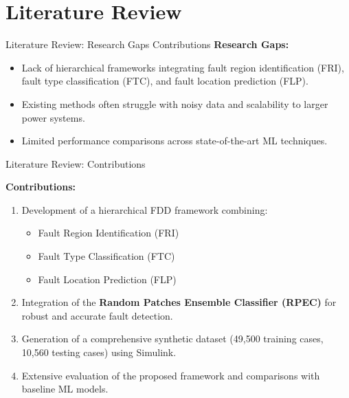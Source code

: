 \section{Literature Review}  

\begin{frame}{Literature Review: Research Gaps Contributions}
  \textbf{Research Gaps:}
  \begin{itemize}
    \item Lack of hierarchical frameworks integrating fault region identification (FRI), fault type classification (FTC), and fault location prediction (FLP).
    \item Existing methods often struggle with noisy data and scalability to larger power systems.
    \item Limited performance comparisons across state-of-the-art ML techniques.
  \end{itemize}
  \vspace{0.5cm}
\end{frame}

\begin{frame}{Literature Review: Contributions}
    
  \textbf{Contributions:}
  \begin{enumerate}
    \item Development of a hierarchical FDD framework combining:
        \begin{itemize}
            \item Fault Region Identification (FRI)
            \item Fault Type Classification (FTC)
            \item Fault Location Prediction (FLP)
        \end{itemize}
    \item Integration of the \textbf{Random Patches Ensemble Classifier (RPEC)} for robust and accurate fault detection.
    \item Generation of a comprehensive synthetic dataset (49,500 training cases, 10,560 testing cases) using Simulink.
    \item Extensive evaluation of the proposed framework and comparisons with baseline ML models.
  \end{enumerate}
\end{frame}
